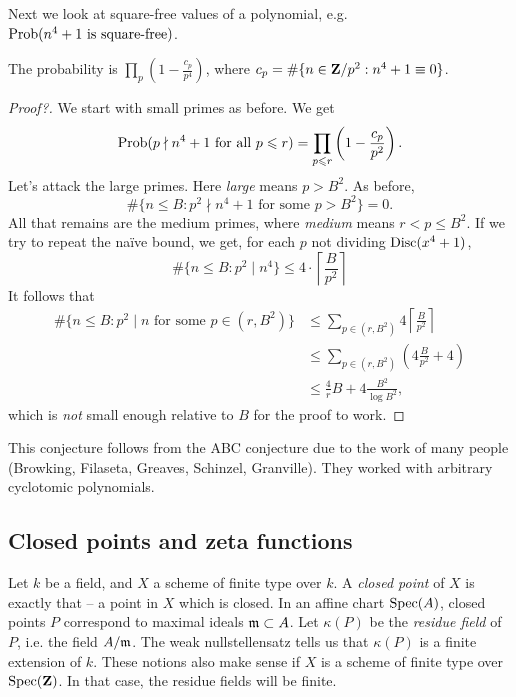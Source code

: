 Next we look at square-free values of a polynomial, e.g. 
$\operatorname{Prob}(n^4+1\text{ is square-free})$. 

\begin{conjecture}
The probability is $\prod_p \left(1-\frac{c_p}{p^4}\right)$, where 
$c_p=\#\{n\in \mathbf{Z}/p^2:n^4+1\equiv 0\}$. 
\end{conjecture}
\begin{proof}[Proof?]
We start with small primes as before. We get 
\[
  \operatorname{Prob}(p\nmid n^4+1\text{ for all $p\leqslant r$}) = \prod_{p\leqslant r}\left(1-\frac{c_p}{p^2}\right) .
\]
Let's attack the large primes. Here \emph{large} means $p>B^2$. As before, 
\[
  \#\{n\leq B:p^2\nmid n^4+1\text{ for some $p>B^2$}\} =0 .
\]
All that remains are the medium primes, where \emph{medium} means 
$r<p\leq B^2$. If we try to repeat the na\"ive bound, we get, for each $p$ 
not dividing $\operatorname{Disc}(x^4+1)$, 
\[
  \#\{n\leq B:p^2\mid n^4\} \leq 4\cdot \left\lceil\frac{B}{p^2}\right\rceil
\]
It follows that 
\begin{align*}
  \#\{n\leq B:p^2\mid n\text{ for some $p\in (r,B^2)$}\} 
    &\leq \sum_{p\in (r,B^2)} 4\left\lceil\frac{B}{p^2}\right\rceil \\
    &\leq \sum_{p\in (r,B^2)} \left(4\frac{B}{p^2} + 4\right) \\
    &\leq \frac 4 r B + 4\frac{B^2}{\log B^2} ,
\end{align*}
which is \emph{not} small enough relative to $B$ for the proof to work. 
\end{proof}

This conjecture follows from the ABC conjecture due to the work of many people 
(Browking, Filaseta, Greaves, Schinzel, Granville). They worked with arbitrary 
cyclotomic polynomials. 





\subsection{Closed points and zeta functions}

Let $k$ be a field, and $X$ a scheme of finite type over $k$. A \emph{closed 
point} of $X$ is exactly that -- a point in $X$ which is closed. In an affine 
chart $\operatorname{Spec}(A)$, closed points $P$ correspond to maximal ideals 
$\mathfrak{m}\subset A$. Let $\kappa(P)$ be the \emph{residue field} of $P$, i.e. the 
field $A/\mathfrak{m}$. The weak nullstellensatz tells us that $\kappa(P)$ is a finite 
extension of $k$. These notions also make sense if $X$ is a scheme of finite 
type over $\operatorname{Spec}(\mathbf{Z})$. In that case, the residue fields will be finite. 


